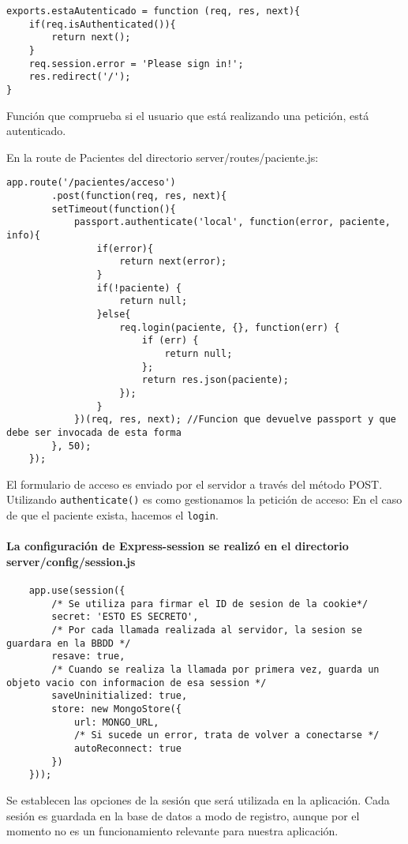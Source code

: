 \medskip
\begin{lstlisting}
exports.estaAutenticado = function (req, res, next){
	if(req.isAuthenticated()){
		return next();
	}
	req.session.error = 'Please sign in!';
	res.redirect('/');
}
\end{lstlisting}


Función que comprueba si el usuario que está realizando una petición, está autenticado.


En la route de Pacientes del directorio server/routes/paciente.js:


\medskip
\begin{lstlisting}
app.route('/pacientes/acceso')
		.post(function(req, res, next){
		setTimeout(function(){
			passport.authenticate('local', function(error, paciente, info){
				if(error){
					return next(error);
				}
				if(!paciente) {
					return null;
				}else{
					req.login(paciente, {}, function(err) {
						if (err) { 
							return null;
						};
						return res.json(paciente);
					});
				}
			})(req, res, next); //Funcion que devuelve passport y que debe ser invocada de esta forma
		}, 50);
	});
\end{lstlisting}


El formulario de acceso es enviado por el servidor a través del método POST. Utilizando \texttt{authenticate()} es como gestionamos la petición de acceso: En el caso de que el paciente exista, hacemos el \texttt{login}.


\paragraph*{La configuración de Express-session se realizó en el directorio server/config/session.js}


\medskip
\begin{lstlisting}
	app.use(session({
		/* Se utiliza para firmar el ID de sesion de la cookie*/
		secret: 'ESTO ES SECRETO',
		/* Por cada llamada realizada al servidor, la sesion se guardara en la BBDD */
		resave: true,
		/* Cuando se realiza la llamada por primera vez, guarda un objeto vacio con informacion de esa session */
		saveUninitialized: true,
		store: new MongoStore({
			url: MONGO_URL,
			/* Si sucede un error, trata de volver a conectarse */
			autoReconnect: true
		})
	}));
\end{lstlisting}


Se establecen las opciones de la sesión que será utilizada en la aplicación. Cada sesión es guardada en la base de datos a modo de registro, aunque por el momento no es un funcionamiento relevante para nuestra aplicación.


